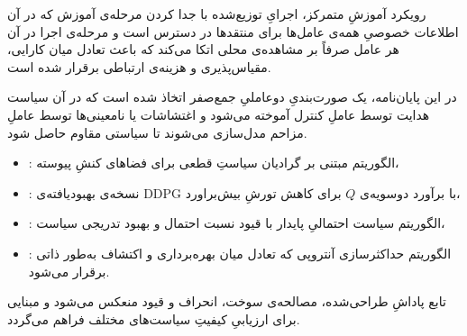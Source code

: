 %
%



رویکرد آموزشِ متمرکز، اجرایِ توزیع‌شده
با جدا کردن مرحله‌ی آموزش که در آن اطلاعات خصوصیِ همه‌ی عامل‌ها برای منتقدها در دسترس است و مرحله‌ی اجرا در آن هر عامل صرفاً بر مشاهده‌ی محلی اتکا می‌کند که باعث تعادل میان کارایی، مقیاس‌پذیری و هزینه‌ی ارتباطی برقرار شده است.

در این پایان‌نامه، یک صورت‌بندیِ دو‌عاملیِ جمع‌صفر اتخاذ شده است که در آن سیاست هدایت توسط {عاملِ کنترل} آموخته می‌شود و اغتشاشات یا نامعینی‌ها توسط {عاملِ مزاحم} مدل‌سازی می‌شوند تا سیاستی مقاوم حاصل شود.

\begin{itemize}
	\item {}: الگوریتم مبتنی بر گرادیان سیاستِ قطعی برای فضاهای کنشِ پیوسته،
	\item {}: نسخه‌ی بهبودیافته‌ی DDPG با برآورد دوسویه‌ی $Q$
	برای کاهش تورشِ بیش‌براورد،
	\item {}: الگوریتم سیاست احتمالیِ پایدار با قیود نسبت احتمال و بهبود تدریجی سیاست،
	\item {}: الگوریتم حداکثرسازی آنتروپی که تعادل میان بهره‌برداری و اکتشاف به‌طور ذاتی برقرار می‌شود.
\end{itemize}

تابع پاداشِ طراحی‌شده، مصالحه‌ی سوخت، انحراف و قیود منعکس می‌شود و مبنایی برای ارزیابیِ کیفیتِ سیاست‌های مختلف فراهم می‌گردد.
